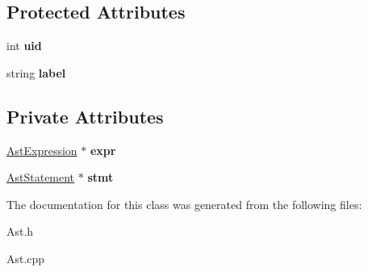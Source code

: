 \subsection*{Protected Attributes}
\begin{DoxyCompactItemize}
\item 
\hypertarget{classAST_a847b778f1c3dd5a19de32de432ee6e15}{int {\bfseries uid}}\label{classAST_a847b778f1c3dd5a19de32de432ee6e15}

\item 
\hypertarget{classAST_ab2e239ccc0688d2341724432ff5a1a31}{string {\bfseries label}}\label{classAST_ab2e239ccc0688d2341724432ff5a1a31}

\end{DoxyCompactItemize}
\subsection*{Private Attributes}
\begin{DoxyCompactItemize}
\item 
\hypertarget{classAstSwitch_a06932d96e20e7afc0bba28cf8c1f3af0}{\hyperlink{classAstExpression}{Ast\-Expression} $\ast$ {\bfseries expr}}\label{classAstSwitch_a06932d96e20e7afc0bba28cf8c1f3af0}

\item 
\hypertarget{classAstSwitch_a31cf695c79ef7e7690a2e48e069d0e51}{\hyperlink{classAstStatement}{Ast\-Statement} $\ast$ {\bfseries stmt}}\label{classAstSwitch_a31cf695c79ef7e7690a2e48e069d0e51}

\end{DoxyCompactItemize}


The documentation for this class was generated from the following files\-:\begin{DoxyCompactItemize}
\item 
Ast.\-h\item 
Ast.\-cpp\end{DoxyCompactItemize}
